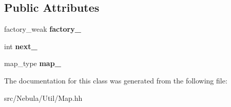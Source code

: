\subsection*{Public Attributes}
\begin{DoxyCompactItemize}
\item 
\hypertarget{classNeb_1_1Map_a7291ffc371a2419502e1765c8a78c14f}{factory\-\_\-weak {\bfseries factory\-\_\-}}\label{classNeb_1_1Map_a7291ffc371a2419502e1765c8a78c14f}

\item 
\hypertarget{classNeb_1_1Map_a8b62fd79e9fc42a74a72f22c21a932ba}{int {\bfseries next\-\_\-}}\label{classNeb_1_1Map_a8b62fd79e9fc42a74a72f22c21a932ba}

\item 
\hypertarget{classNeb_1_1Map_a90e63f3ea00d82d366192f092cdb5fa9}{map\-\_\-type {\bfseries map\-\_\-}}\label{classNeb_1_1Map_a90e63f3ea00d82d366192f092cdb5fa9}

\end{DoxyCompactItemize}


The documentation for this class was generated from the following file\-:\begin{DoxyCompactItemize}
\item 
src/\-Nebula/\-Util/Map.\-hh\end{DoxyCompactItemize}
